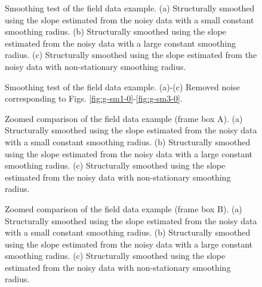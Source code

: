 \begin{figure}[htb!]
\centering
{}
\caption{Smoothing test of the field data example. (a) Structurally smoothed using the slope estimated from the noisy data with a small constant smoothing radius. (b) Structurally smoothed using the slope estimated from the noisy data with a large constant smoothing radius. (c) Structurally smoothed using the slope estimated from the noisy data with non-stationary smoothing radius.}
\label{fig:g-sm1-0,g-sm2-0,g-sm3-0}
\end{figure}

\begin{figure}[htb!]
\centering
{}
\caption{Smoothing test of the field data example. (a)-(c) Removed noise corresponding to Figs. \ref{fig:g-sm1-0}-\ref{fig:g-sm3-0}.}
\label{fig:g-sm1-n,g-sm2-n,g-sm3-n}
\end{figure}

\begin{figure}[htb!]
\centering
{}
\caption{Zoomed comparison of the field data example (frame box A). (a) Structurally smoothed using the slope estimated from the noisy data with a small constant smoothing radius. (b) Structurally smoothed using the slope estimated from the noisy data with a large constant smoothing radius. (c) Structurally smoothed using the slope estimated from the noisy data with non-stationary smoothing radius.}
\label{fig:g-sm1-z-a0,g-sm2-z-a0,g-sm3-z-a0}
\end{figure}

\begin{figure}[htb!]
\centering
{}
\caption{Zoomed comparison of the field data example (frame box B). (a) Structurally smoothed using the slope estimated from the noisy data with a small constant smoothing radius. (b) Structurally smoothed using the slope estimated from the noisy data with a large constant smoothing radius. (c) Structurally smoothed using the slope estimated from the noisy data with non-stationary smoothing radius.}
\label{fig:g-sm1-z-b0,g-sm2-z-b0,g-sm3-z-b0}
\end{figure}

